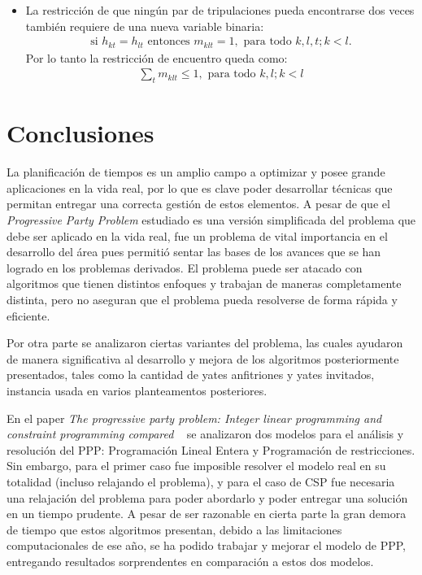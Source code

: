 \documentclass[letter, 10pt]{article}
\begin{document}
\begin{itemize}
\begin{itemize}
        \item La restricción de que ningún par de tripulaciones pueda encontrarse dos veces también requiere de una nueva variable binaria:
        \begin{align*}
            \text{si } h_{kt} = h_{lt} \text{ entonces } m_{klt} = 1, \text{ para todo } k,l,t; k<l.
        \end{align*}
        Por lo tanto la restricción de encuentro queda como:
        \begin{align*}
            \sum_{t} m_{klt} \leq 1 ,\text{ para todo } k,l;k<l
        \end{align*}
    \end{itemize}
\end{itemize}


\section{Conclusiones}
La planificación de tiempos es un amplio campo a optimizar y posee grande aplicaciones en la vida real, por lo que es clave poder desarrollar técnicas que permitan entregar una correcta gestión de estos elementos. A pesar de que el \textit{Progressive Party Problem} estudiado es una versión simplificada del problema que debe ser aplicado en la vida real, fue un
problema de vital importancia en el desarrollo del área pues permitió sentar las bases de los avances que se han logrado en los problemas derivados. El problema puede ser atacado con algoritmos que tienen distintos enfoques y trabajan
de maneras completamente distinta, pero no aseguran que el problema pueda resolverse de forma rápida y eficiente.

Por otra parte se analizaron ciertas variantes del problema, las cuales ayudaron de manera significativa al desarrollo y mejora de los algoritmos posteriormente presentados, tales como la cantidad de yates anfitriones y yates invitados, instancia usada en varios planteamentos posteriores.

En el paper \textit{The progressive party problem: Integer linear programming and constraint programming compared} ~\cite{Smith1996} se analizaron dos modelos para el análisis y resolución del PPP: Programación Lineal Entera y Programación de restricciones. Sin embargo, para el primer caso fue imposible resolver el modelo real en su totalidad (incluso relajando el problema), y para el caso de CSP fue necesaria una relajación del problema para poder abordarlo y poder entregar una solución en un tiempo prudente. A pesar de ser razonable en cierta parte la gran demora de tiempo que estos algoritmos presentan, debido a las limitaciones computacionales de ese año, se ha podido trabajar y mejorar el modelo de PPP, entregando resultados sorprendentes en comparación a estos dos modelos.
\end{document}
